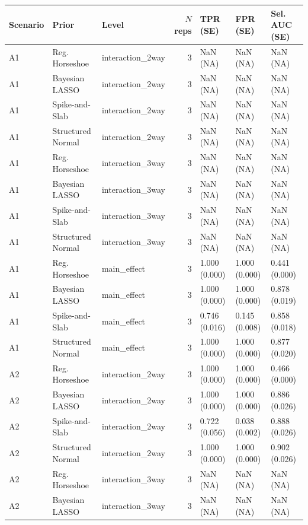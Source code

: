 \begin{tabular}{lllrlll}
  \hline
Scenario & Prior & Level & $N$ reps & TPR (SE) & FPR (SE) & Sel. AUC (SE) \\ 
  \hline
A1 & Reg. Horseshoe & interaction\_2way &   3 & NaN (NA) & NaN (NA) & NaN (NA) \\ 
  A1 & Bayesian LASSO & interaction\_2way &   3 & NaN (NA) & NaN (NA) & NaN (NA) \\ 
  A1 & Spike-and-Slab & interaction\_2way &   3 & NaN (NA) & NaN (NA) & NaN (NA) \\ 
  A1 & Structured Normal & interaction\_2way &   3 & NaN (NA) & NaN (NA) & NaN (NA) \\ 
  A1 & Reg. Horseshoe & interaction\_3way &   3 & NaN (NA) & NaN (NA) & NaN (NA) \\ 
  A1 & Bayesian LASSO & interaction\_3way &   3 & NaN (NA) & NaN (NA) & NaN (NA) \\ 
  A1 & Spike-and-Slab & interaction\_3way &   3 & NaN (NA) & NaN (NA) & NaN (NA) \\ 
  A1 & Structured Normal & interaction\_3way &   3 & NaN (NA) & NaN (NA) & NaN (NA) \\ 
  A1 & Reg. Horseshoe & main\_effect &   3 & 1.000 (0.000) & 1.000 (0.000) & 0.441 (0.000) \\ 
  A1 & Bayesian LASSO & main\_effect &   3 & 1.000 (0.000) & 1.000 (0.000) & 0.878 (0.019) \\ 
  A1 & Spike-and-Slab & main\_effect &   3 & 0.746 (0.016) & 0.145 (0.008) & 0.858 (0.018) \\ 
  A1 & Structured Normal & main\_effect &   3 & 1.000 (0.000) & 1.000 (0.000) & 0.877 (0.020) \\ 
  A2 & Reg. Horseshoe & interaction\_2way &   3 & 1.000 (0.000) & 1.000 (0.000) & 0.466 (0.000) \\ 
  A2 & Bayesian LASSO & interaction\_2way &   3 & 1.000 (0.000) & 1.000 (0.000) & 0.886 (0.026) \\ 
  A2 & Spike-and-Slab & interaction\_2way &   3 & 0.722 (0.056) & 0.038 (0.002) & 0.888 (0.026) \\ 
  A2 & Structured Normal & interaction\_2way &   3 & 1.000 (0.000) & 1.000 (0.000) & 0.902 (0.026) \\ 
  A2 & Reg. Horseshoe & interaction\_3way &   3 & NaN (NA) & NaN (NA) & NaN (NA) \\ 
  A2 & Bayesian LASSO & interaction\_3way &   3 & NaN (NA) & NaN (NA) & NaN (NA) \\ 

\end{tabular}
